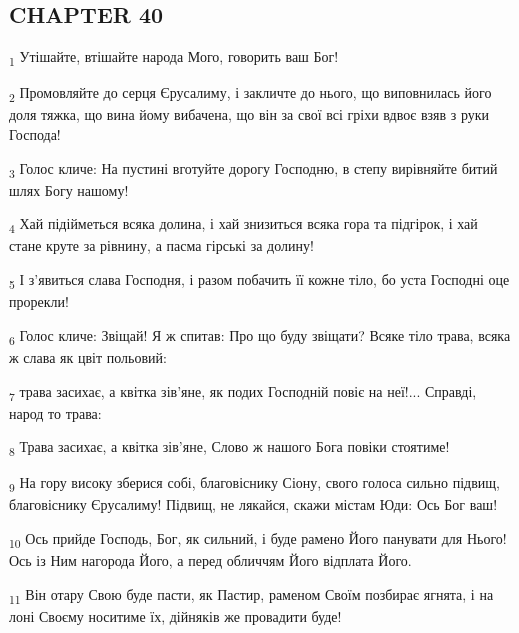 \subsection{CHAPTER 40}
\begin{tcolorbox}
\textsubscript{1} Утішайте, втішайте народа Мого, говорить ваш Бог!
\end{tcolorbox}
\begin{tcolorbox}
\textsubscript{2} Промовляйте до серця Єрусалиму, і закличте до нього, що виповнилась його доля тяжка, що вина йому вибачена, що він за свої всі гріхи вдвоє взяв з руки Господа!
\end{tcolorbox}
\begin{tcolorbox}
\textsubscript{3} Голос кличе: На пустині вготуйте дорогу Господню, в степу вирівняйте битий шлях Богу нашому!
\end{tcolorbox}
\begin{tcolorbox}
\textsubscript{4} Хай підійметься всяка долина, і хай знизиться всяка гора та підгірок, і хай стане круте за рівнину, а пасма гірські за долину!
\end{tcolorbox}
\begin{tcolorbox}
\textsubscript{5} І з'явиться слава Господня, і разом побачить її кожне тіло, бо уста Господні оце прорекли!
\end{tcolorbox}
\begin{tcolorbox}
\textsubscript{6} Голос кличе: Звіщай! Я ж спитав: Про що буду звіщати? Всяке тіло трава, всяка ж слава як цвіт польовий:
\end{tcolorbox}
\begin{tcolorbox}
\textsubscript{7} трава засихає, а квітка зів'яне, як подих Господній повіє на неї!... Справді, народ то трава:
\end{tcolorbox}
\begin{tcolorbox}
\textsubscript{8} Трава засихає, а квітка зів'яне, Слово ж нашого Бога повіки стоятиме!
\end{tcolorbox}
\begin{tcolorbox}
\textsubscript{9} На гору високу зберися собі, благовіснику Сіону, свого голоса сильно підвищ, благовіснику Єрусалиму! Підвищ, не лякайся, скажи містам Юди: Ось Бог ваш!
\end{tcolorbox}
\begin{tcolorbox}
\textsubscript{10} Ось прийде Господь, Бог, як сильний, і буде рамено Його панувати для Нього! Ось із Ним нагорода Його, а перед обличчям Його відплата Його.
\end{tcolorbox}
\begin{tcolorbox}
\textsubscript{11} Він отару Свою буде пасти, як Пастир, раменом Своїм позбирає ягнята, і на лоні Своєму носитиме їх, дійняків же провадити буде!
\end{tcolorbox}
